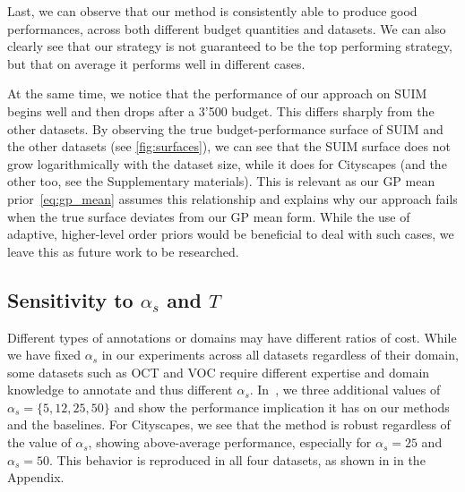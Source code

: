 Last, we can observe that our method is consistently able to produce good performances, across both different budget quantities and datasets. We can also clearly see that our strategy is not guaranteed to be the top performing strategy, but that on average it performs well in different cases. 

At the same time, we notice that the performance of our approach on SUIM begins well and then drops after a 3'500 budget. This differs sharply from the other datasets. By observing the true budget-performance surface of SUIM and the other datasets (see \cref{fig:surfaces}), we can see that the SUIM surface does not grow logarithmically with the dataset size, while it does for Cityscapes (and the other too, see the Supplementary materials). This is relevant as our GP mean prior~\eqref{eq:gp_mean} assumes this relationship and explains why our approach fails when the true surface deviates from our GP mean form. While the use of adaptive, higher-level order priors would be beneficial to deal with such cases, we leave this as future work to be researched.



\subsection{Sensitivity to \texorpdfstring{$\alpha_s$}{as} and \texorpdfstring{$T$}{T}}
Different types of annotations or domains may have different ratios of cost. While we have fixed $\alpha_s$ in our experiments across all datasets regardless of their domain, some datasets such as OCT and VOC require different expertise and domain knowledge to annotate and thus different $\alpha_s$. In~, we three additional values of $\alpha_s = \{5, 12, 25, 50\}$ and show the performance implication it has on our methods and the baselines. For Cityscapes, we see that the method is robust regardless of the value of $\alpha_s$, showing above-average performance, especially for $\alpha_s = 25$ and $\alpha_s = 50$. This behavior is reproduced in all four datasets, as shown in  in the Appendix.



